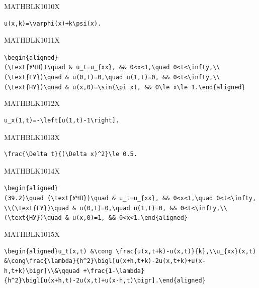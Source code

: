\documentclass[
  ukrainian,
]{article}
\begin{document}
MATHBLK1010X

\begin{verbatim}
u(x,k)=\varphi(x)+k\psi(x).
\end{verbatim}

MATHBLK1011X

\texttt{\textbackslash{}begin\{aligned\}(\textbackslash{}text\{УЧП\})\textbackslash{}quad\ \&\ u\_t=u\_\{xx\},\ \&\&\ 0\textless{}x\textless{}1,\textbackslash{}quad\ 0\textless{}t\textless{}\textbackslash{}infty,\textbackslash{}\textbackslash{}(\textbackslash{}text\{ГУ\})\textbackslash{}quad\ \&\ u(0,t)=0,\textbackslash{}quad\ u(1,t)=0,\ \&\&\ 0\textless{}t\textless{}\textbackslash{}infty,\textbackslash{}\textbackslash{}(\textbackslash{}text\{НУ\})\textbackslash{}quad\ \&\ u(x,0)=\textbackslash{}sin(\textbackslash{}pi\ x),\ \&\&\ 0\textbackslash{}le\ x\textbackslash{}le\ 1.\textbackslash{}end\{aligned\}}

MATHBLK1012X

\begin{verbatim}
u_x(1,t)=-\left[u(1,t)-1\right].
\end{verbatim}

MATHBLK1013X

\begin{verbatim}
\frac{\Delta t}{(\Delta x)^2}\le 0.5.
\end{verbatim}

MATHBLK1014X

\texttt{\textbackslash{}begin\{aligned\}(39.2)\textbackslash{}quad\ (\textbackslash{}text\{УЧП\})\textbackslash{}quad\ \&\ u\_t=u\_\{xx\},\ \&\&\ 0\textless{}x\textless{}1,\textbackslash{}quad\ 0\textless{}t\textless{}\textbackslash{}infty,\textbackslash{}\textbackslash{}(\textbackslash{}text\{ГУ\})\textbackslash{}quad\ \&\ u(0,t)=0,\textbackslash{}quad\ u(1,t)=0,\ \&\&\ 0\textless{}t\textless{}\textbackslash{}infty,\textbackslash{}\textbackslash{}(\textbackslash{}text\{НУ\})\textbackslash{}quad\ \&\ u(x,0)=1,\ \&\&\ 0\textless{}x\textless{}1.\textbackslash{}end\{aligned\}}

MATHBLK1015X

\begin{verbatim}
\begin{aligned}u_t(x,t) &\cong \frac{u(x,t+k)-u(x,t)}{k},\\u_{xx}(x,t) &\cong\frac{\lambda}{h^2}\bigl[u(x+h,t+k)-2u(x,t+k)+u(x-h,t+k)\bigr]\\&\qquad +\frac{1-\lambda}{h^2}\bigl[u(x+h,t)-2u(x,t)+u(x-h,t)\bigr].\end{aligned}
\end{verbatim}
\end{document}
